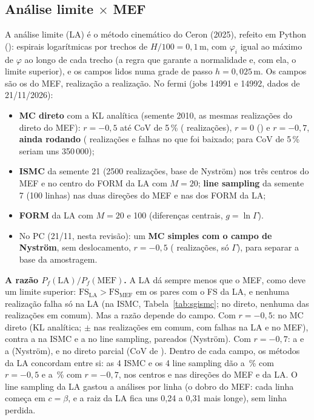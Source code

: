\documentclass[11pt,a4paper]{article}
\begin{document}
\subsection{Análise limite \texorpdfstring{$\times$}{x} MEF}\label{sec:lamef}
A análise limite (LA) é o método cinemático do Ceron (2025), refeito em Python ():
espirais logarítmicas por trechos de $H/100 = 0{,}1$\,m, com $\varphi_i$ igual ao máximo de $\varphi$ ao longo de cada
trecho (a regra que garante a normalidade e, com ela, o limite superior), e os campos lidos numa grade de passo
$h = 0{,}025$\,m. Os campos são os do MEF, realização a realização. No fermi (jobs 14991 e 14992, dados de 21/11/2026):
\begin{itemize}
  \item \textbf{MC direto} com a KL analítica (semente 2010, as mesmas realizações do direto do MEF): $r = -0{,}5$
    até CoV de 5\,\% (\lmDirRaN{} realizações), $r = 0$ (\lmDirZN) e $r = -0{,}7$, \textbf{ainda rodando}
    (\lmDirRbN{} realizações e \lmDirRbFal{} falhas no que foi baixado; para CoV de 5\,\% seriam uns 350\,000);
  \item \textbf{ISMC} da semente 21 (2500 realizações, base de Nyström) nos três centros do MEF e no centro do FORM da
    LA com $M = 20$; \textbf{line sampling} da semente 7 (100 linhas) nas duas direções do MEF e nas dos FORM da LA;
  \item \textbf{FORM} da LA com $M = 20$ e 100 (diferenças centrais, $g = \ln\Gamma$).
  \item No PC (21/11, nesta revisão): um \textbf{MC simples com o campo de Nyström}, sem deslocamento, $r = -0{,}5$
    (\lnyN{} realizações, só $\Gamma$), para separar a base da amostragem.
\end{itemize}
\textbf{A razão $P_f(\text{LA})/P_f(\text{MEF})$.} A LA dá sempre menos que o MEF, como deve um limite superior:
$\mathrm{FS}_\text{LA} > \mathrm{FS}_\text{MEF}$ em \lmAcima{} os pares com o FS da LA, e nenhuma realização falha só na
LA (na ISMC, Tabela~\ref{tab:sgismc}; no direto, nenhuma das \lmDirRaParN{} realizações em comum). Mas a razão depende
do campo. Com $r = -0{,}5$: \lmDirRaRaz{} no MC
direto (KL analítica; \lmDirRaParRaz{} $\pm$ \lmDirRaParErr{} nas \lmDirRaParN{} realizações em comum, com
\lmDirRaParFl{} falhas na LA e \lmDirRaParFm{} no MEF), contra \lmIsRazRaMin{} a \lmIsRazRaMax{} na ISMC e
\lmLsRazRaMin{} a \lmLsRazRaMax{} no line sampling, pareados (Nyström). Com $r = -0{,}7$: \lmIsRazRbMin{} a
\lmIsRazRbMax{} e \lmLsRazRbMin{} a \lmLsRazRbMax{} (Nyström), e \lmDirRbRaz{} no direto parcial (CoV de
\lmDirRbCov). Dentro de cada campo, os métodos da LA concordam entre si: as 4 ISMC e os 4 line sampling dão
\lmTodosRaMin{} a \lmTodosRaMax\,\% com $r = -0{,}5$ e \lmTodosRbMin{} a \lmTodosRbMax\,\% com
$r = -0{,}7$, nos centros e nas direções do MEF e da LA. O line sampling da LA gastou \lmLsNaRaMin{} a \lmLsNaRbMax{}
análises por linha (o dobro do
MEF: cada linha começa em $c = \beta$, e a raiz da LA fica uns 0,24 a 0,31 mais longe), sem linha perdida.

\end{document}
